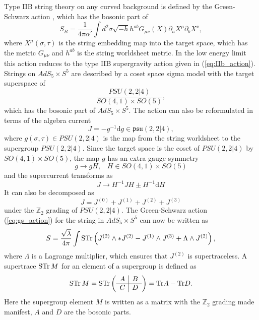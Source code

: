 Type IIB string theory on any curved background is defined by the Green-Schwarz action \cite{green}, which has the bosonic part of
\begin{equation}
	S_B = \frac{1}{4\pi\alpha'} \int d^2 \sigma \sqrt{-h} h^{ab} G_{\mu\nu}(X) \partial_a X^\mu \partial_b X^\nu,
	\label{eq:gs_action}
\end{equation}
where $X^\mu(\sigma, \tau)$ is the string embedding map into the target space, which has the metric $G_{\mu\nu}$ and $h^{ab}$ is the string worldsheet metric. In the low energy limit this action reduces to the type IIB supergravity action given in (\ref{eq:IIb_action}). Strings on $AdS_5 \times S^5$ are described by a coset space sigma model \cite{tseytlin_nlsm} with the target superspace of
\begin{equation}
	\frac{PSU(2,2|4)}{SO(4,1) \times SO(5)},
\end{equation}
\vspace{1pt}
which has the bosonic part of $AdS_5 \times S^5$. The action can also be reformulated in terms of the algebra current 
\begin{equation}
	J = -g^{-1} \mathrm{d} g \in \mathfrak{psu(2,2|4)},
	\label{eq:j_current}
\end{equation}
where $g(\sigma, \tau) \in PSU(2,2|4)$ is the map from the string worldsheet to the supergroup $PSU(2,2|4)$. Since the target space is the coset of $PSU(2,2|4)$ by $SO(4,1) \times SO(5)$, the map $g$ has an extra gauge symmetry
\begin{equation}
	g \rightarrow gH, \,\,\,\,\, H \in SO(4,1) \times SO(5)
\end{equation}
and the supercurrent transforms as
\begin{equation}
	J \rightarrow H^{-1} J H \pm H^{-1} \mathrm{d} H
	\label{eq:j_gauge}
\end{equation}
It can also be decomposed as 
\begin{equation}
	J = J^{(0)} + J^{(1)} + J^{(2)} + J^{(3)}
\end{equation}
under the $\mathbb{Z}_2$ grading of $PSU(2,2|4)$. The Green-Schwarz action (\ref{eq:gs_action}) for the string in $AdS_5 \times S^5$ can now be written as \cite{current_action}
\begin{equation}
	S = \frac{\sqrt{\lambda}}{4 \pi} \int \operatorname{STr} \left( J^{(2)} \wedge * J^{(2)} - J^{(1)} \wedge J^{(3)} + \Lambda \wedge J^{(2)} \right),
\end{equation}
where $\Lambda$ is a Lagrange multiplier, which ensures that $J^{(2)}$ is supertraceless. A supertrace $\operatorname{STr} M$ for an element of a supergroup is defined as
\begin{equation}
\operatorname{STr} M = \operatorname{STr}
\left( {\begin{array}{c|c}
 A & B  \\
 \hline
 C & D  \\
 \end{array} } \right) = \mathrm{Tr} A - \mathrm{Tr} D.
\end{equation}
Here the supergroup element $M$ is written as a matrix with the $\mathbb{Z}_2$ grading made manifest, $A$ and $D$ are the bosonic parts.

